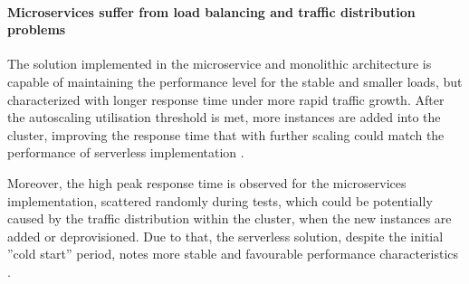 

\paragraph{Microservices suffer from load balancing and traffic distribution problems}

The solution implemented in the microservice and monolithic architecture is capable of maintaining the performance level for the stable and smaller loads, but characterized with longer response time under more rapid traffic growth. After the autoscaling utilisation threshold is met, more instances are added into the cluster, improving the response time that with further scaling could match the performance of serverless implementation \cite{ServerlessComputingAnInvestigationOfDeploymentEnvironmentsForWebAPIs}.

Moreover, the high peak response time is observed for the microservices implementation, scattered randomly during tests, which could be potentially caused by the traffic distribution within the cluster, when the new instances are added or deprovisioned. Due to that, the serverless solution, despite the initial ''cold start'' period, notes more stable and favourable performance characteristics \cite{MicroservicesvsServerlessAPerformanceComparisonOnCloudNativeWebApplication}.





